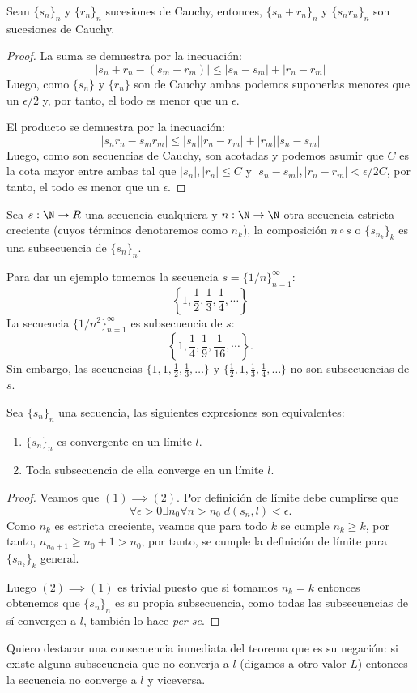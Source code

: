\documentclass[11pt,oneside,a4paper]{book}
\begin{document}
\begin{thm}
Sean $\{s_n\}_n$ y $\{r_n\}_n$ sucesiones de Cauchy, entonces, $\{s_n+r_n\}_n$ y $\{s_nr_n\}_n$ son sucesiones de Cauchy.
\end{thm}
\begin{proof}
La suma se demuestra por la inecuación:
$$|s_n+r_n-(s_m+r_m)|\leq|s_n-s_m|+|r_n-r_m|$$
Luego, como $\{s_n\}$ y $\{r_n\}$ son de Cauchy ambas podemos suponerlas menores que un $\epsilon/2$ y, por tanto, el todo es menor que un $\epsilon$.

El producto se demuestra por la inecuación:
$$|s_nr_n-s_mr_m|\leq|s_n||r_n-r_m|+|r_m||s_n-s_m|$$
Luego, como son secuencias de Cauchy, son acotadas y podemos asumir que $C$ es la cota mayor entre ambas tal que $|s_n|,|r_n|\leq C$ y $|s_n-s_m|,|r_n-r_m|\lt \epsilon/2C$, por tanto, el todo es menor que un $\epsilon$.
\end{proof}
\begin{mydef}[Subsecuencia]
Sea $s:\N\rightarrow R$ una secuencia cualquiera y $n:\N\rightarrow\N$ otra secuencia estricta creciente (cuyos términos denotaremos como $n_k$), la composición $n\circ s$ o $\{s_{n_k}\}_k$ es una subsecuencia de $\{s_n\}_n$.
\end{mydef}
Para dar un ejemplo tomemos la secuencia $s=\{1/n\}_{n=1}^\infty$:
$$\left\{1,\frac 12,\frac 13,\frac 14,\cdots\right\}$$
La secuencia $\{1/n^2\}_{n=1}^\infty$ es subsecuencia de $s$:
$$\left\{1,\frac 14,\frac 19,\frac{1}{16},\cdots\right\}.$$
Sin embargo, las secuencias $\{1,1,\frac 12,\frac 13,\dots\}$ y $\{\frac 12,1,\frac 13,\frac 14,\dots\}$ no son subsecuencias de $s$.
\begin{thm}
Sea $\{s_n\}_n$ una secuencia, las siguientes expresiones son equivalentes:
\begin{enumerate}[(1)]
\item $\{s_n\}_n$ es convergente en un límite $l$.
\item Toda subsecuencia de ella converge en un límite $l$.
\end{enumerate}
\end{thm}
\begin{proof}
Veamos que $(1)\implies(2)$. Por definición de límite debe cumplirse que
$$\forall\epsilon\gt 0\exists n_0\forall n\gt n_0\;d(s_n,l)\lt\epsilon.$$
Como $n_k$ es estricta creciente, veamos que para todo $k$ se cumple $n_k\geq k$, por tanto, $n_{n_0+1}\geq n_0+1\gt n_0$, por tanto, se cumple la definición de límite para $\{s_{n_k}\}_k$ general.

Luego $(2)\implies(1)$ es trivial puesto que si tomamos $n_k=k$ entonces obtenemos que $\{s_n\}_n$ es su propia subsecuencia, como todas las subsecuencias de sí convergen a $l$, también lo hace \textit{per se}.
\end{proof}
Quiero destacar una consecuencia inmediata del teorema que es su negación: si existe alguna subsecuencia que no converja a $l$ (digamos a otro valor $L$) entonces la secuencia no converge a $l$ y viceversa.
\end{document}
